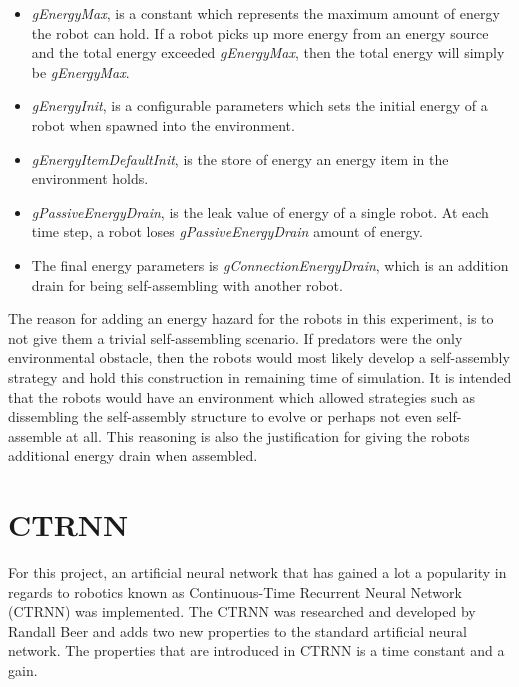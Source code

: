 \begin{itemize}

\item \emph{gEnergyMax}, is a constant which represents the maximum amount of energy the robot can hold.
If a robot picks up more energy from an energy source and the total energy exceeded \emph{gEnergyMax}, then the total energy will simply be \emph{gEnergyMax}.

\item \emph{gEnergyInit}, is a configurable parameters which sets the initial energy of a robot when spawned into the environment.

\item \emph{gEnergyItemDefaultInit}, is the store of energy an energy item in the environment holds.

\item \emph{gPassiveEnergyDrain}, is the leak value of energy of a single robot. At each time step, a robot loses \emph{gPassiveEnergyDrain} amount of energy.

\item The final energy parameters is \emph{gConnectionEnergyDrain}, which is an addition drain for being self-assembling with another robot.


\end{itemize}


The reason for adding an energy hazard for the robots in this experiment, is to not give them a trivial self-assembling scenario.
If predators were the only environmental obstacle, then the robots would most likely develop a self-assembly strategy and hold this construction in remaining time of simulation.
It is intended that the robots would have an environment which allowed strategies such as dissembling the self-assembly structure to evolve or perhaps not even self-assemble at all.
This reasoning is also the justification for giving the robots additional energy drain when assembled.

\section{CTRNN}
\label{sec:ctrnn}
For this project, an artificial neural network that has gained a lot a popularity in regards to robotics known as Continuous-Time Recurrent Neural Network (CTRNN) was implemented. 
The CTRNN was researched and developed by Randall Beer\cite{beer_dynamics_1997} and adds two new properties to the standard artificial neural network. 
The properties that are introduced in CTRNN is a time constant and a gain.

